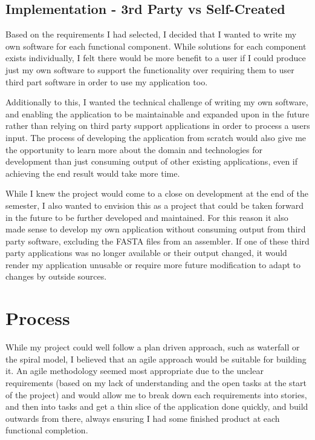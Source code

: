 \subsection{Implementation - 3rd Party vs Self-Created}
Based on the requirements I had selected, I decided that I wanted to write my own software for each functional component. While solutions for each component exists individually, I felt there would be more benefit to a user if I could produce just my own software to support the functionality over requiring them to user third part software in order to use my application too.

Additionally to this, I wanted the technical challenge of writing my own software, and enabling the application to be maintainable and expanded upon in the future rather than relying on third party support applications in order to process a users input. The process of developing the application from scratch would also give me the opportunity to learn more about the domain and technologies for development than just consuming output of other existing applications, even if achieving the end result would take more time.

While I knew the project would come to a close on development at the end of the semester, I also wanted to envision this as a project that could be taken forward in the future to be further developed and maintained. For this reason it also made sense to develop my own application without consuming output from third party software, excluding the FASTA files from an assembler. If one of these third party applications was no longer available or their output changed, it would render my application unusable or require more future modification to adapt to changes by outside sources.


\section{Process}
While my project could well follow a plan driven approach, such as waterfall or the spiral model, I believed that an agile approach would be suitable for building it. An agile methodology seemed most appropriate due to the unclear requirements (based on my lack of understanding and the open tasks at the start of the project) and would allow me to break down each requirements into stories, and then into tasks and get a thin slice of the application done quickly, and build outwards from there, always ensuring I had some finished product at each functional completion.

